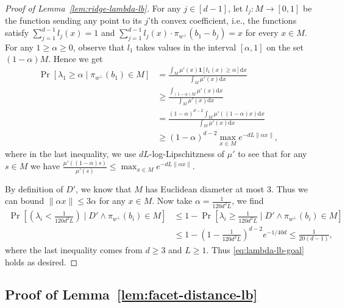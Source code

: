 \documentclass{theoretics}
\begin{document}
\begin{proof}[Proof of Lemma~\ref{lem:ridge-lambda-lb}]
    For any $j \in [d-1]$, let $l_j : M \to [0, 1]$ be the function sending any point
    to its $j$'th convex coefficient, i.e., the functions satisfy $\sum_{j=1}^{d-1} l_j(x) = 1$
    and $\sum_{j=1}^{d-1} l_j(x) \cdot \pi_{w^\perp}(b_1 - b_j)  = x$ for every $x \in M$.
    For any $1 \geq \alpha \geq 0$, observe that $l_1$
    takes values in the interval $[\alpha, 1]$
    on the set $(1-\alpha) M$. Hence we get
    \begin{align*}
        \Pr[\lambda_1 \geq \alpha \mid \pi_{w^\perp}(b_1) \in M]
        &= \frac{
            \int_{M} \mu'(x) \mathbf{1}[l_1(x) \geq \alpha] \mathrm d x
            }{
                \int_{M} \mu'(x) \mathrm d x
            } \\
        &\geq \frac{
            \int_{(1-\alpha) M} \mu'(x) \mathrm d x
            }{
                \int_{M} \mu'(x) \mathrm d x
            }
            \tag{$\forall x \in (1-\alpha)M$, $l_1(x) \geq \alpha$}\\
        &= \frac{
            (1-\alpha)^{d-2} \int_{M} \mu'((1-\alpha)x) \mathrm d x
            }{
                \int_{M} \mu'(x) \mathrm d x
            }
            \\
        &\geq
            (1-\alpha)^{d-2} \max_{x \in M} e^{-dL\|\alpha x\|},
    \end{align*}
    where in the last inequality, we use $dL$-log-Lipschitzness of $\mu'$ to see that for any $s \in M$
    we have $\frac{\mu'((1-\alpha)s)}{\mu'(s)} \leq \max_{x \in M}e^{-dL \|\alpha x\|}$.
    
    By definition of $D'$, we know that $M$ has Euclidean diameter at most $3$.
    Thus we can bound $\|\alpha x\| \leq 3\alpha$ for any $x\in M$.
    Now take $\alpha = \frac{1}{120d^2L}$, we find
    \begin{align*}
        \Pr[(\lambda_i < \frac{1}{120d^2 L}) \mid D' \wedge \pi_{w^\perp}(b_i) \in M] &\leq 1 -
        \Pr[\lambda_i \geq \frac{1}{120d^2 L} \mid D' \wedge \pi_{w^\perp}(b_i) \in M] \\
        &\leq 1 - (1-\frac{1}{120 d^2 L})^{d-2} e^{-1/40d}
        \leq \frac{1}{20(d-1)},
    \end{align*}
    where the last inequality comes from $d \geq 3$ and $L \geq 1$. Thus \eqref{eq:lambda-lb-goal} holds as desired.
\end{proof}



\subsection{Proof of Lemma~\ref{lem:facet-distance-lb}}\label{sec:pf-facet-dist}
\end{document}

